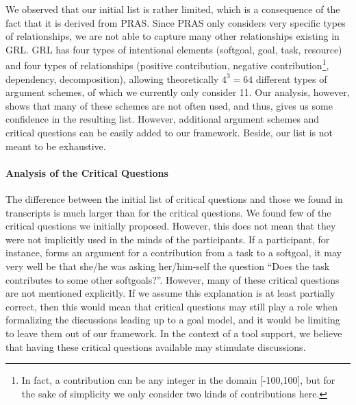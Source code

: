 We observed that our initial list is rather limited, which is a consequence of the fact that it is derived from PRAS. Since PRAS only considers very specific types of relationships, we are not able to capture many other relationships existing in GRL. GRL has four types of intentional elements (softgoal, goal, task, resource) and four types of relationships (positive contribution, negative contribution\footnote{In fact, a contribution can be any integer in the domain [-100,100], but for the sake of simplicity we only consider two kinds of contributions here.}, dependency, decomposition), allowing theoretically $4^3=64$ different types of argument schemes, of which we currently only consider 11. 
Our analysis, however, shows that many of these schemes are not often used, and thus, gives us some confidence in the resulting list. However, additional argument schemes and critical questions can be easily added to our framework. Beside, our list is not meant to be exhaustive.

\paragraph{Analysis of the Critical Questions} The difference between the initial list of critical questions and those we found in transcripts is much larger than for the critical questions. %
We found few of the critical questions we initially proposed. %
However, this does not mean that they were not implicitly used in the minds of the participants. If a participant, for instance, forms an argument for a contribution from a task to a softgoal, it may very well be that she/he was asking her/him-self the question ``Does the task contributes to some other softgoals?''. However, many of these critical questions are not mentioned explicitly. If we assume this explanation is at least partially correct, then this would mean that critical questions may still play a role when formalizing the discussions leading up to a goal model, and it would be limiting to leave them out of our framework. In the context of a tool support, we believe that having these critical questions available may stimulate discussions. %